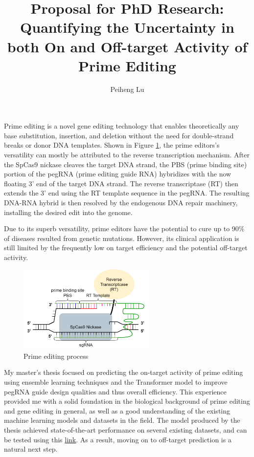 \documentclass[a4,12pt]{article}
\title{Proposal for PhD Research: 
Quantifying the Uncertainty in both On and Off-target Activity of Prime Editing}
\author{Peiheng Lu}
\begin{document}
\maketitle

Prime editing is a novel gene editing technology that enables theoretically any base substitution, insertion, and deletion without the need for double-strand breaks or donor DNA templates\cite{liudavidr.SearchreplaceGenomeEditing2019,liuPrimeEditingPrecise2023}. Shown in Figure \ref{fig:prime-editing-process}, the prime editors's versatility can mostly be attributed to the reverse transcription mechanism. After the SpCas9 nickase cleaves the target DNA strand, the PBS (prime binding site) portion of the pegRNA (prime editing guide RNA) hybridizes with the now floating 3' end of the target DNA strand. The reverse transcriptase (RT) then extends the 3' end using the RT template sequence in the pegRNA. The resulting DNA-RNA hybrid is then resolved by the endogenous DNA repair machinery, installing the desired edit into the genome.

Due to its superb versatility, prime editors have the potential to cure up to 90\% of diseases resulted from genetic mutations\cite{kantorCRISPRCas9DNABaseEditing2020}. However, its clinical application is still limited by the frequently low on target efficiency and the potential off-target activity\cite{zhaoPrimeEditingAdvances2023}.

\begin{figure}
    \centering
    \includegraphics[width=0.6\textwidth]{prime-editing-process.png}
    \caption{Prime editing process}
    \label{fig:prime-editing-process}
\end{figure}

My master's thesis focused on predicting the on-target activity of prime editing using ensemble learning techniques and the Transformer model to improve pegRNA guide design qualities and thus overall efficiency. This experience provided me with a solid foundation in the biological background of prime editing and gene editing in general, as well as a good understanding of the existing machine learning models and datasets in the field. The model produced by the thesis achieved state-of-the-art performance on several existing datasets, and can be tested using this \href{https://github.com/PeihengLu/ox-dissertation/tree/main}{link}. As a result, moving on to off-target prediction is a natural next step.
\end{document}

